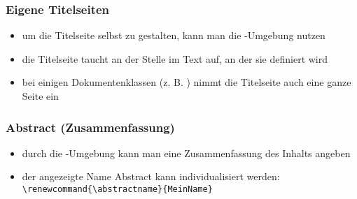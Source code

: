 \begin{frame}
	\frametitle{Eigene Titelseiten}
	\begin{itemize}
		\item um die Titelseite selbst zu gestalten, kann man die -Umgebung nutzen
	\end{itemize} \vfill
		 \vfill
	\begin{itemize}
		\item die Titelseite taucht an der Stelle im Text auf, an der sie definiert wird
		\item bei einigen Dokumentenklassen (z. B. ) nimmt die Titelseite auch eine ganze Seite ein
	\end{itemize}
\end{frame}

\begin{frame}[fragile]
	\frametitle{Abstract (Zusammenfassung)}
	\begin{itemize}
		\item durch die -Umgebung kann man eine Zusammenfassung des Inhalts angeben
	\end{itemize} \vfill
	 \vfill
	\begin{itemize}
        \item der angezeigte Name \glqq Abstract\grqq{} kann individualisiert werden:\\
		\lstinline$\renewcommand{\abstractname}{MeinName}$
	\end{itemize}
\end{frame}

